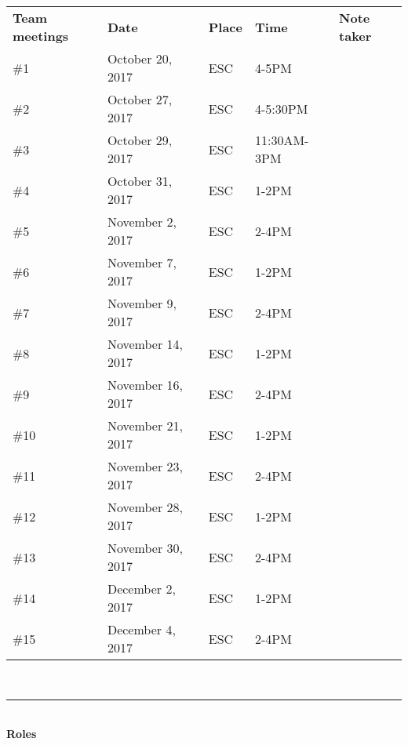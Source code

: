 \documentclass{article}
\newcommand\tab[1][1cm]{\hspace*{#1}}
\begin{document}
	\begin{tabularx}{\linewidth}{ l L{3cm} L{1.5cm} L{2.5cm} l }
		\textbf{Team meetings} & \textbf{Date} & \textbf{Place} & \textbf{Time} & \textbf{Note taker} \\
		\tab[0.5cm] \#1 & October 20, 2017 & ESC & 4-5PM & \\
		\tab[0.5cm] \#2 & October 27, 2017 & ESC & 4-5:30PM & \\
		\tab[0.5cm] \#3 & October 29, 2017 & ESC & 11:30AM-3PM & \\
		\tab[0.5cm] \#4 & October 31, 2017 & ESC & 1-2PM & \\
		\tab[0.5cm] \#5 & November 2, 2017 & ESC & 2-4PM & \\
		\tab[0.5cm] \#6 & November 7, 2017 & ESC & 1-2PM & \\
		\tab[0.5cm] \#7 & November 9, 2017 & ESC & 2-4PM & \\
		\tab[0.5cm] \#8 & November 14, 2017 & ESC & 1-2PM & \\
		\tab[0.5cm] \#9 & November 16, 2017 & ESC & 2-4PM & \\
		\tab[0.5cm] \#10 & November 21, 2017 & ESC & 1-2PM & \\
		\tab[0.5cm] \#11 & November 23, 2017 & ESC & 2-4PM & \\
		\tab[0.5cm] \#12 & November 28, 2017 & ESC & 1-2PM & \\
		\tab[0.5cm] \#13 & November 30, 2017 & ESC & 2-4PM & \\
		\tab[0.5cm] \#14 & December 2, 2017 & ESC & 1-2PM & \\
		\tab[0.5cm] \#15 & December 4, 2017 & ESC & 2-4PM & \\
	\end{tabularx} \\
	\noindent\rule{\textwidth}{0.4pt} \\
	\noindent\textbf{Roles}

	\renewcommand{\labelitemi}{}
	\renewcommand{\labelitemii}{\textbullet}
\end{document}
